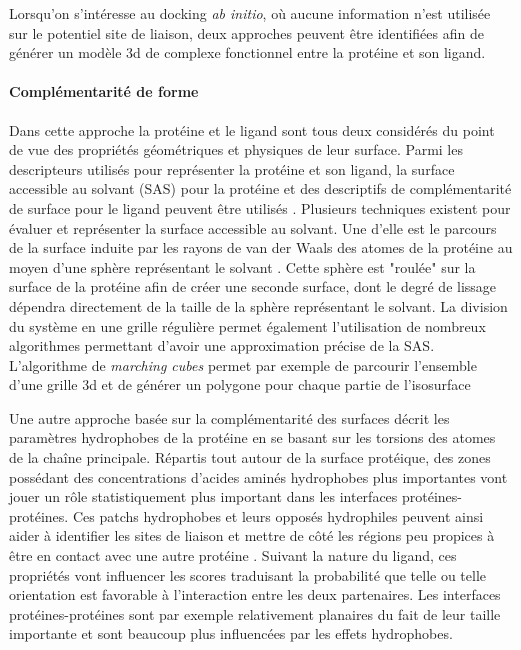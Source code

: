 Lorsqu'on s'intéresse au docking \textit{ab initio}, où aucune information n'est utilisée sur le potentiel site de liaison, deux approches peuvent être identifiées afin de générer un modèle 3d de complexe fonctionnel entre la protéine et son ligand.

\paragraph{Complémentarité de forme}

Dans cette approche la protéine et le ligand sont tous deux considérés du point de vue des propriétés géométriques et physiques de leur surface. Parmi les descripteurs utilisés pour représenter la protéine et son ligand, la surface accessible au solvant (SAS) pour la protéine et des descriptifs de complémentarité de surface pour le ligand peuvent être utilisés \cite{shoichet1992molecular}. Plusieurs techniques existent pour évaluer et représenter la surface accessible au solvant. Une d'elle est le parcours de la surface induite par les rayons de van der Waals des atomes de la protéine au moyen d'une sphère représentant le solvant \cite{connolly1983analytical}. Cette sphère est "roulée" sur la surface de la protéine afin de créer une seconde surface, dont le degré de lissage dépendra directement de la taille de la sphère représentant le solvant. La division du système en une grille régulière permet également l'utilisation de nombreux algorithmes permettant d'avoir une approximation précise de la SAS. L'algorithme de \textit{marching cubes} permet par exemple de parcourir l'ensemble d'une grille 3d et de générer un polygone pour chaque partie de l'isosurface 

Une autre approche basée sur la complémentarité des surfaces décrit les paramètres hydrophobes de la protéine en se basant sur les torsions des atomes de la chaîne principale. Répartis tout autour de la surface protéique, des zones possédant des concentrations d'acides aminés hydrophobes plus importantes vont jouer un rôle statistiquement plus important dans les interfaces protéines-protéines. Ces patchs hydrophobes et leurs opposés hydrophiles peuvent ainsi aider à identifier les sites de liaison et mettre de côté les régions peu propices à être en contact avec une autre protéine \cite{jones1996principles}. Suivant la nature du ligand, ces propriétés vont influencer les scores traduisant la probabilité que telle ou telle orientation est favorable à l'interaction entre les deux partenaires. Les interfaces protéines-protéines sont par exemple relativement planaires du fait de leur taille importante et sont beaucoup plus influencées par les effets hydrophobes.

